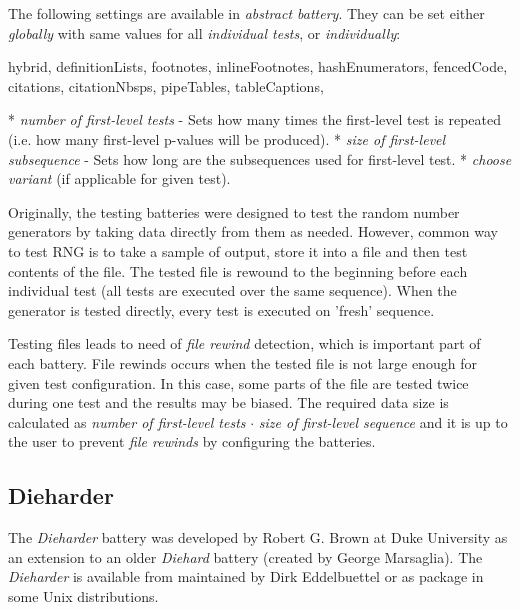 \documentclass[
  digital,     %
  oneside,     %
  nosansbold,  %
  nocolorbold, %
  nolof,         %
  nolot,         %
]{fithesis4}
\begin{document}
The following settings are available in \emph{abstract battery}. They can be set either \emph{globally} with same values for all \emph{individual tests}, or \emph{individually}:
\begin{markdown*}{%
  hybrid,
  definitionLists,
  footnotes,
  inlineFootnotes,
  hashEnumerators,
  fencedCode,
  citations,
  citationNbsps,
  pipeTables,
  tableCaptions,
}

* \emph{number of first-level tests} - Sets how many times the first-level test is repeated (i.e. how many first-level p-values will be produced).
* \emph{size of first-level subsequence} - Sets how long are the subsequences used for first-level test.
* \emph{choose variant} (if applicable for given test).


\end{markdown*}



Originally, the testing batteries were designed to test the random number generators by taking data directly from them as needed. However, common way to test RNG is to take a sample of output, store it into a file and then test contents of the file. The tested file is rewound to the beginning before each individual test (all tests are executed over the same sequence). When the generator is tested directly, every test is executed on 'fresh' sequence. 

Testing files leads to need of \emph{file rewind} detection, which is important part of each battery. File rewinds occurs when the tested file is not large enough for given test configuration. In this case, some parts of the file are tested twice during one test and the results may be biased. The required data size is calculated as \emph{number of first-level tests} $\cdot$ \emph{size of first-level sequence} and it is up to the user to prevent \emph{file rewinds} by configuring the batteries.


\subsection{Dieharder} \label{chap:sols-dieharder}
The \emph{Dieharder} battery was developed by Robert G. Brown at Duke University\cite{dieharder_orig} as an extension to an older \emph{Diehard} battery (created by George Marsaglia). The \emph{Dieharder} is available from \cite{dieharder-git} maintained by Dirk Eddelbuettel or as package in some Unix distributions.
\end{document}
